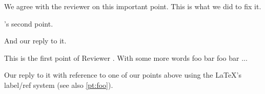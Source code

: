 \documentclass{response}
\begin{document}

\begin{point}
	\lipsum[1]
\end{point}

\begin{response}
	We agree with the reviewer on this important point. This is what we did to
	fix it. 
	\lipsum[2]
\end{response}

\begin{action}
    \lipsum[1]
    
    \lipsum[1]
    
    \begin{change}[Section 1]
    	\lipsum[2]
     
    	\lipsum[3]
    \end{change}
    
    \lipsum[4]
    
    \begin{change}[Section 2]
    	\lipsum[5]
     
    	\lipsum[6]
    \end{change}
\end{action}

\begin{point}
	\Reviewer's second point.
	\label{pt:bar}
\end{point}

\begin{response}
	And our reply to it.
\end{response}


\begin{point}
	This is the first point of Reviewer \Reviewer. With some more words foo
	bar foo bar ...
\end{point}

\begin{response}
	Our reply to it with reference to one of our points above using the \LaTeX's 
	label/ref system (see also \ref{pt:foo}).
\end{response}
\end{document}
